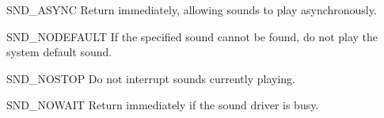 \begin{datadesc}{SND_ASYNC}
  Return immediately, allowing sounds to play asynchronously.
\end{datadesc}

\begin{datadesc}{SND_NODEFAULT}
  If the specified sound cannot be found, do not play the system default
  sound.
\end{datadesc}

\begin{datadesc}{SND_NOSTOP}
  Do not interrupt sounds currently playing.
\end{datadesc}

\begin{datadesc}{SND_NOWAIT}
  Return immediately if the sound driver is busy.
\end{datadesc}
